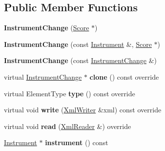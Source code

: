 \subsection*{Public Member Functions}
\begin{DoxyCompactItemize}
\item 
\mbox{\label{class_ms_1_1_instrument_change_a5d66374bcffb86fc30afcc975f896eec}} 
{\bfseries Instrument\+Change} (\hyperlink{class_ms_1_1_score}{Score} $\ast$)
\item 
\mbox{\label{class_ms_1_1_instrument_change_a18cec57624b82ab1782bb6251bfea739}} 
{\bfseries Instrument\+Change} (const \hyperlink{class_ms_1_1_instrument}{Instrument} \&, \hyperlink{class_ms_1_1_score}{Score} $\ast$)
\item 
\mbox{\label{class_ms_1_1_instrument_change_af1f9f30360d2e1f9d66733434232bc35}} 
{\bfseries Instrument\+Change} (const \hyperlink{class_ms_1_1_instrument_change}{Instrument\+Change} \&)
\item 
\mbox{\label{class_ms_1_1_instrument_change_a9a698db5b66eee67b8afcd17736b72bf}} 
virtual \hyperlink{class_ms_1_1_instrument_change}{Instrument\+Change} $\ast$ {\bfseries clone} () const override
\item 
\mbox{\label{class_ms_1_1_instrument_change_a1901022fbf1c9772bc1a220aee6f4309}} 
virtual Element\+Type {\bfseries type} () const override
\item 
\mbox{\label{class_ms_1_1_instrument_change_a427f2cdb5597aebd09a9ab19df8366a8}} 
virtual void {\bfseries write} (\hyperlink{class_ms_1_1_xml_writer}{Xml\+Writer} \&xml) const override
\item 
\mbox{\label{class_ms_1_1_instrument_change_a9617b83155dfb60ec821e509dde41b32}} 
virtual void {\bfseries read} (\hyperlink{class_ms_1_1_xml_reader}{Xml\+Reader} \&) override
\item 
\mbox{\label{class_ms_1_1_instrument_change_a905055ebd752c2f2e4fc950f1361bc5a}} 
\hyperlink{class_ms_1_1_instrument}{Instrument} $\ast$ {\bfseries instrument} () const

\end{DoxyCompactItemize}
